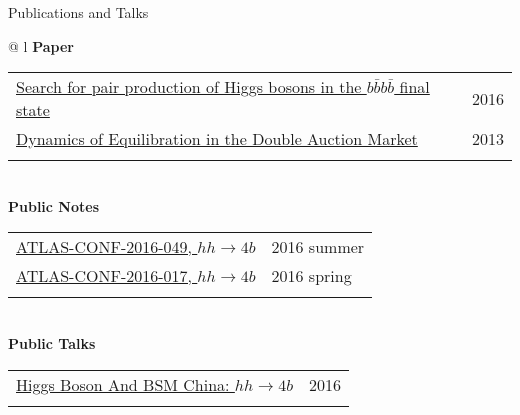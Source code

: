 \documentclass[letterpaper,11pt,oneside]{article}
\begin{document}
\raggedright
 \Large{Publications and Talks} \\
 \normalsize
\begin{flushleft}
\hspace{1cm}
 \begin{tabular}{@{} l}
    \textbf{Paper} \\ 
    \begin{tabular}{@{} l l }
    \href{http://arxiv.org/abs/1606.04782}{Search for pair production of Higgs bosons in the $b\bar{b}b\bar{b}$ final state} & 2016 \\
    \href{http://www.sciencedirect.com/science/article/pii/S0167268112002612}{Dynamics of Equilibration in the Double Auction Market} & 2013 \\
    \hspace{0.7\linewidth} & \hspace{0.1\linewidth} \\
     \end{tabular}
     \\
    \textbf{Public Notes} \\ 
    \begin{tabular}{@{} l l }
    \href{https://atlas.web.cern.ch/Atlas/GROUPS/PHYSICS/CONFNOTES/ATLAS-CONF-2016-049/}{ATLAS-CONF-2016-049, $hh\to4b$}  & 2016 summer\\
    \href{https://atlas.web.cern.ch/Atlas/GROUPS/PHYSICS/CONFNOTES/ATLAS-CONF-2016-017/}{ATLAS-CONF-2016-017, $hh\to4b$}  & 2016 spring\\
    \hspace{0.7\linewidth} & \hspace{0.1\linewidth} \\
     \end{tabular}
     \\
     \textbf{Public Talks} \\
     \begin{tabular}{@{} l l }
 \href{http://indico.ihep.ac.cn/event/5635/session/86/contribution/40}{Higgs Boson And BSM China: $hh\to4b$}& 2016\\
    \hspace{0.7\linewidth} & \hspace{0.1\linewidth} \\
      \end{tabular}
      \end{tabular}
\end{flushleft}
\end{document}
